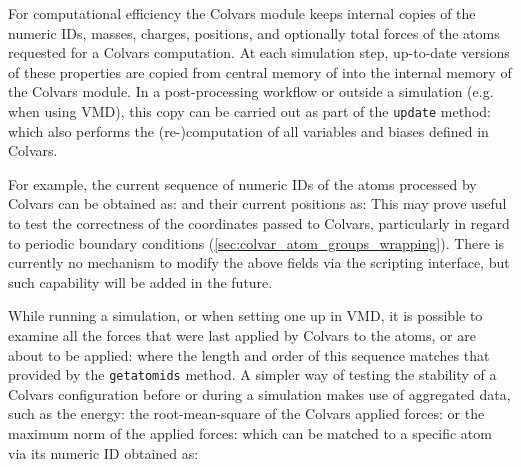 {{

For computational efficiency the Colvars module keeps internal copies of the numeric IDs, masses, charges, positions, and optionally total forces of the atoms requested for a Colvars computation.
At each simulation step, up-to-date versions of these properties are copied from central memory of \MDENGINE{} into the internal memory of the Colvars module.
In a post-processing workflow or outside a simulation (e.g.{} when using VMD), this copy can be carried out as part of the \texttt{update} method:
\noindent{}which also performs the (re-)computation of all variables and biases defined in Colvars.

For example, the current sequence of numeric IDs of the atoms processed by Colvars can be obtained as:
\noindent{}and their current positions as:
\noindent{}This may prove useful to test the correctness of the coordinates passed to Colvars, particularly in regard to periodic boundary conditions (\ref{sec:colvar_atom_groups_wrapping}).
There is currently no mechanism to modify the above fields via the scripting interface, but such capability will be added in the future.


While running a simulation, or when setting one up in VMD, it is possible to examine all the forces that were last applied by Colvars to the atoms, or are about to be applied:
\noindent{}where the length and order of this sequence matches that provided by the \texttt{getatomids} method.
A simpler way of testing the stability of a Colvars configuration before or during a simulation makes use of aggregated data, such as the energy:
\noindent{}the root-mean-square of the Colvars applied forces:
\noindent{}or the maximum norm of the applied forces:
\noindent{}which can be matched to a specific atom via its numeric ID obtained as:

}}
